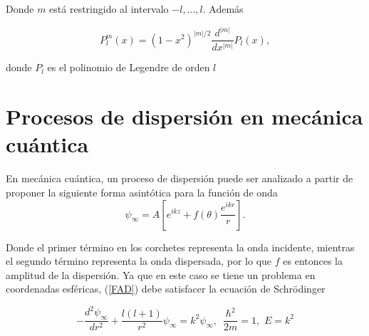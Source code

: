 Donde $m$ está restringido al intervalo $-l, ... ,l$. Además

\begin{equation*}
	P^m_l(x) = (1-x^2)^{|m|/2} \frac{d^{|m|}}{dx^{|m|}} P_l(x),
\end{equation*}

donde $P_l$ es el polinomio de Legendre de orden $l$
\section{Procesos de dispersión en mecánica cuántica}

En mecánica cuántica, un proceso de dispersión puede ser analizado a partir de proponer la siguiente forma asintótica para la función de onda
\begin{equation}
	\psi_{\infty} = A \left[e^{i k z} + f(\theta)  \frac{e^{i k r}}{r} \right]. \label{FAD}
\end{equation}

Donde el primer término en los corchetes representa la onda incidente, mientras el segundo término representa la onda dispersada, por lo que $f$ es entonces la amplitud de la dispersión. Ya que en este caso se tiene un problema en coordenadas esféricas, (\ref{FAD}) debe satisfacer la ecuación de Schrödinger 

\begin{equation}
-\frac{d^2\psi_{\infty}}{dr^2} + \frac{l(l+1)}{r^2}\psi_{\infty} = k^2 \psi_{\infty} , \,\,\, \frac{\hbar^2}{2m}=1, \,\, E=k^2
\end{equation}


